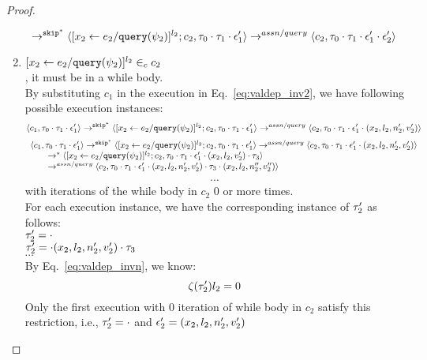 \begin{proof}
\begin{case}[$P(\cdot)$]
\begin{subproof}[Subproof]
\begin{enumerate}
\[  \rightarrow^{\mathtt{skip}^*} 
  \langle [\mathrel{ {x}_2 \leftarrow e_2 / {\tt query}(\psi_2) }]^{l_2} ; {c}_2, \mathtt{\tau}_0 \cdot \mathtt{\tau}_1 \cdot \mathtt{\epsilon}_1' \rangle 
  \rightarrow^{assn/query} 
  \langle {c}_2,  \mathtt{\tau}_0 \cdot \mathtt{\tau}_1 \cdot \mathtt{\epsilon}_1' \cdot \mathtt{\epsilon}_2' \rangle 
 \]
%
\item{$[\mathrel{ {x}_2 \leftarrow e_2 / {\tt query}(\psi_2) }]^{l_2} \in_c c_2$}
\\
, it must be in a while body.
\\
 By substituting $c_1$ in the execution in Eq.~\ref{eq:valdep_inv2}, we have following possible execution instances:
  \[
  \langle c_1, \mathtt{\tau}_0 \cdot \mathtt{\tau}_1 \cdot \mathtt{\epsilon}_1' \rangle 
  \rightarrow^{\mathtt{skip}^*} 
  \langle [\mathrel{ {x}_2 \leftarrow e_2 / {\tt query}(\psi_2) }]^{l_2} ; {c}_2, \mathtt{\tau}_0 \cdot \mathtt{\tau}_1 \cdot \mathtt{\epsilon}_1' \rangle 
  \rightarrow^{assn/query} 
  \langle {c}_2,  \mathtt{\tau}_0 \cdot \mathtt{\tau}_1 \cdot \mathtt{\epsilon}_1' \cdot (x_2, l_2, n_2', v_2') \rangle 
 \]
%
  \[
  \begin{array}{l}
  \langle c_1, \mathtt{\tau}_0 \cdot \mathtt{\tau}_1 \cdot \mathtt{\epsilon}_1' \rangle 
  \rightarrow^{\mathtt{skip}^*} 
  \langle [\mathrel{ {x}_2 \leftarrow e_2 / {\tt query}(\psi_2) }]^{l_2} ; {c}_2, \mathtt{\tau}_0 \cdot \mathtt{\tau}_1 \cdot \mathtt{\epsilon}_1' \rangle 
  \rightarrow^{assn/query} 
  \langle {c}_2,  \mathtt{\tau}_0 \cdot \mathtt{\tau}_1 \cdot \mathtt{\epsilon}_1' \cdot (x_2, l_2, n_2', v_2') \rangle 
  \\ \qquad
  \rightarrow^{*} 
  \langle [\mathrel{ {x}_2 \leftarrow e_2 / {\tt query}(\psi_2) }]^{l_2} ; {c}_2, 
  \mathtt{\tau}_0 \cdot \mathtt{\tau}_1 \cdot \mathtt{\epsilon}_1' \cdot (x_2, l_2, v_2') \cdot \mathtt{\tau}_3 \rangle 
  \\ \qquad
  \rightarrow^{assn/query} 
  \langle {c}_2,  \mathtt{\tau}_0 \cdot \mathtt{\tau}_1 \cdot \mathtt{\epsilon}_1' \cdot (x_2, l_2, n_2', v_2') \cdot \mathtt{\tau}_3 \cdot (x_2, l_2, n_2'', v_2'') \rangle 
 \end{array}
 \]
\[
  \cdots
\] 
with iterations of the while body in $c_2$ $0$ or more times.
%
\\
%
For each execution instance, we have the corresponding instance of $\mathtt{\tau}_2'$ as follows:
\\
  $\mathtt{\tau}_2'  = \cdot$
\\
$\mathtt{\tau}_2' = \cdot (x_2, l_2, n_2', v_2') \cdot \mathtt{\tau}_3 $
%
\\
$\cdots$
%
\\
%
By Eq.~\ref{eq:valdep_invn}, we know:
%
\[
 \mathtt{\zeta}(\mathtt{\tau}_2') l_2 = 0
\]
%
Only the first execution with 0 iteration of while body in $c_2$ satisfy this restriction, i.e., $\mathtt{\tau}_2' = \cdot$ and $\mathtt{\epsilon}_2' = (x_2, l_2, n_2', v_2')$
%
\end{enumerate}

\end{subproof}
\end{case}
\end{proof}
